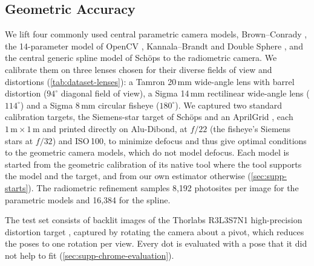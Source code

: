 \subsection{Geometric Accuracy}
\label{sec:geometric-accuracy}
We lift four commonly used central parametric camera models,
Brown--Conrady \cite{Brown1966DecenteringDO}, the 14-parameter model
of OpenCV \cite{opencv_library}, Kannala--Brandt \cite{kannala-brandt}
and Double Sphere \cite{double-sphere}, and the central generic spline
model of Schöps \etal \cite{10000params} to the radiometric camera. We
calibrate them on three lenses chosen for their diverse fields of view
and distortions (\cref{tab:dataset-lenses}): a Tamron 20\,mm
wide-angle lens with barrel distortion ($94^\circ$ diagonal field of
view), a Sigma 14\,mm rectilinear wide-angle lens ($114^\circ$) and a
Sigma 8\,mm circular fisheye ($180^\circ$). We captured two
standard calibration targets, the Siemens-star target of Schöps \etal
\cite{10000params} and an AprilGrid \cite{furgale2013unified}, each
$1\,\mathrm{m}\times1\,\mathrm{m}$ and printed directly on Alu-Dibond,
at $f/22$ (the fisheye's Siemens
stars at $f/32$) and ISO\,100, to minimize defocus and thus give
optimal conditions to the geometric camera models, which do not model
defocus. Each model is started from the geometric calibration of its
native tool where the tool supports the model and the target, and
from our own estimator otherwise (\cref{sec:supp-starts}). The
radiometric refinement samples 8,192 photosites per image for the
parametric models and 16,384 for the spline.

The test set consists of backlit images of the Thorlabs R3L3S7N1
high-precision distortion target \cite{thorlabsR3L3S7N1}, captured
by rotating the camera about a pivot, which reduces the poses to one
rotation per view. Every dot is evaluated with a pose that it did
not help to fit (\cref{sec:supp-chrome-evaluation}). 
%         

